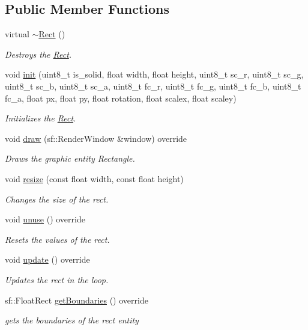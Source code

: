 \subsection*{Public Member Functions}
\begin{DoxyCompactItemize}
\item 
virtual \hyperlink{class_rect_a46a2a29ee00ff71d28ccdf9b0f217be9}{$\sim$\+Rect} ()
\begin{DoxyCompactList}\small\item\em Destroys the \hyperlink{class_rect}{Rect}. \end{DoxyCompactList}\item 
void \hyperlink{class_rect_aa780623e4639a2679ed300424142d50d}{init} (uint8\+\_\+t is\+\_\+solid, float width, float height, uint8\+\_\+t sc\+\_\+r, uint8\+\_\+t sc\+\_\+g, uint8\+\_\+t sc\+\_\+b, uint8\+\_\+t sc\+\_\+a, uint8\+\_\+t fc\+\_\+r, uint8\+\_\+t fc\+\_\+g, uint8\+\_\+t fc\+\_\+b, uint8\+\_\+t fc\+\_\+a, float px, float py, float rotation, float scalex, float scaley)
\begin{DoxyCompactList}\small\item\em Initializes the \hyperlink{class_rect}{Rect}. \end{DoxyCompactList}\item 
void \hyperlink{class_rect_a57801edbfb2c000c631a610c59e7ff20}{draw} (sf\+::\+Render\+Window \&window) override
\begin{DoxyCompactList}\small\item\em Draws the graphic entity Rectangle. \end{DoxyCompactList}\item 
void \hyperlink{class_rect_ab7593e78f2fbc2354d8ef832ac3625a7}{resize} (const float width, const float height)
\begin{DoxyCompactList}\small\item\em Changes the size of the rect. \end{DoxyCompactList}\item 
void \hyperlink{class_rect_a85afbe7fde3b74bd81c07cc58d5c61bd}{unuse} () override
\begin{DoxyCompactList}\small\item\em Resets the values of the rect. \end{DoxyCompactList}\item 
void \hyperlink{class_rect_af74b7ea3228d0d7b4c40bb8fe6daed63}{update} () override
\begin{DoxyCompactList}\small\item\em Updates the rect in the loop. \end{DoxyCompactList}\item 
sf\+::\+Float\+Rect \hyperlink{class_rect_a17056b26af5522b024e9628386d34335}{get\+Boundaries} () override
\begin{DoxyCompactList}\small\item\em gets the boundaries of the rect entity \end{DoxyCompactList}\end{DoxyCompactItemize}
